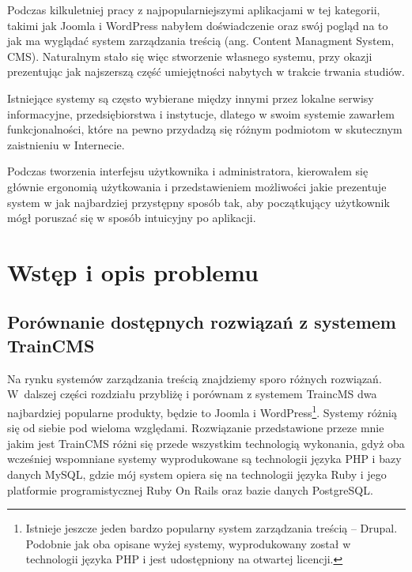 \documentclass[openright]{xmgr}
\begin{document}

\maketitle

\introduction
Podczas kilkuletniej pracy z najpopularniejszymi aplikacjami w tej kategorii, takimi jak Joomla i WordPress nabyłem doświadczenie oraz swój pogląd na to jak ma wyglądać system zarządzania treścią (ang. Content Managment System, CMS). Naturalnym stało się więc stworzenie własnego systemu, przy okazji prezentując jak najszerszą część umiejętności nabytych w trakcie trwania studiów.

Istniejące systemy są często wybierane między innymi przez lokalne serwisy informacyjne, przedsiębiorstwa i instytucje, dlatego w swoim systemie zawarłem funkcjonalności, które na pewno przydadzą się różnym podmiotom w skutecznym zaistnieniu w Internecie.

Podczas tworzenia interfejsu użytkownika i administratora, kierowałem się głównie ergonomią użytkowania i przedstawieniem możliwości jakie prezentuje system w jak najbardziej przystępny sposób tak, aby początkujący użytkownik mógł poruszać się w sposób intuicyjny po aplikacji.

\chapter{Wstęp i opis problemu}

\section{Porównanie dostępnych rozwiązań z systemem TrainCMS}

Na rynku systemów zarządzania treścią znajdziemy sporo różnych rozwiązań. W~dalszej części rozdziału przybliżę i porównam z systemem TraincMS dwa najbardziej popularne produkty, będzie to Joomla i WordPress\footnote{Istnieje jeszcze jeden bardzo popularny system zarządzania treścią -- Drupal. Podobnie jak oba opisane wyżej systemy, wyprodukowany został w technologii języka PHP i jest udostępniony na otwartej licencji.}. Systemy różnią się od siebie pod wieloma względami. Rozwiązanie przedstawione przeze mnie jakim jest TrainCMS różni się  przede wszystkim technologią wykonania, gdyż oba wcześniej wspomniane systemy wyprodukowane są technologii języka PHP i bazy danych MySQL, gdzie mój system opiera się na technologii języka Ruby i jego platformie programistycznej Ruby On Rails oraz bazie danych PostgreSQL.
\end{document}
